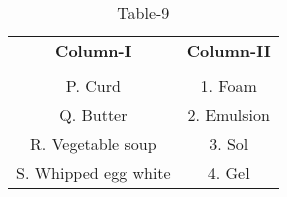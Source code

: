 \begin{table}[htbp]
  \centering
  \caption{Table-9}
  \label{tab:tables/table9.tex}
  \begin{tabular}{cc}
  \textbf{Column-I} & \textbf{Column-II} \\ \\
    P. Curd & 1. Foam \\
    Q. Butter & 2. Emulsion \\
    R. Vegetable soup & 3. Sol \\
    S. Whipped egg white & 4. Gel \\
  \end{tabular}
\end{table}

